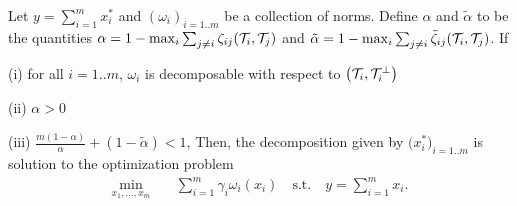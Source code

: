 \documentclass{article}
\begin{document}
\begin{theorem}
\label{theo:two}
Let $y=\sum_{i=1}^{m}x_{i}^*$ and  $(\omega_{i})_{i=1..m}$ be a collection of norms. Define $\alpha$ and $\tilde{\alpha}$ to be the quantities $\alpha=1-\max_{i} \sum_{j\neq i} \zeta_{ij}(\mathcal{T}_i,\mathcal{T}_j)$ and $\tilde{\alpha}=1-\max_{i} \sum_{j\neq i} \tilde{\zeta}_{ij}(\mathcal{T}_i,\mathcal{T}_j)$. If  
\BET
\item[(i)] for all $i=1..m$, $\omega_{i}$ is decomposable with respect to $\big(\mathcal{T}_i,\mathcal{T}_i^{\perp}\big)$
\item[(ii)]  $\alpha>0$ %
\item[(iii)] $\frac{m(1-\alpha)}{\alpha}+ (1-\tilde{\alpha})<1$, %
\EET
Then, the  decomposition given by $\big(x_{i}^*\big)_{i=1..m}$ is solution to the optimization problem \begin{align*}
\min_{x_{1},...,x_{m}} &\quad \sum_{i=1}^{m} \gamma_{i}\omega_{i}(x_{i})\quad \text{s.t.} \quad y=\sum_{i=1}^{m}x_{i}.
\end{align*}
\end{theorem}
\end{document}
